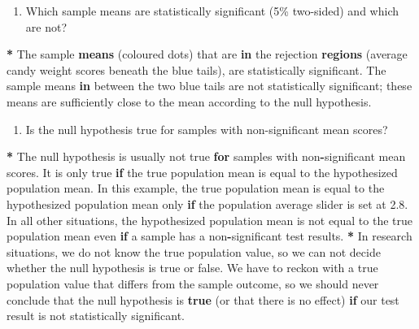 \documentclass[a4paper]{book}
\newenvironment{Shaded}{\begin{snugshade}}{\end{snugshade}}
\newcommand{\KeywordTok}[1]{\textcolor[rgb]{0,0,0}{\textbf{#1}}}
\newcommand{\FloatTok}[1]{\textcolor[rgb]{0.00,0.00,0.00}{#1}}
\newcommand{\StringTok}[1]{\textcolor[rgb]{0.00,0.00,0.00}{#1}}
\newcommand{\ControlFlowTok}[1]{\textcolor[rgb]{0.00,0.00,0.00}{\textbf{#1}}}
\newcommand{\OperatorTok}[1]{\textcolor[rgb]{0.00,0.00,0.00}{\textbf{#1}}}
\newcommand{\NormalTok}[1]{#1}
\providecommand{\tightlist}{%
  \setlength{\itemsep}{0pt}\setlength{\parskip}{0pt}}
\theoremstyle{definition}
\theoremstyle{definition}
\theoremstyle{definition}
\theoremstyle{remark}
\begin{document}
\begin{enumerate}
\def\labelenumi{\arabic{enumi}.}
\tightlist
\item
  Which sample means are statistically significant (5\% two-sided) and
  which are not?
\end{enumerate}

\begin{Shaded}
\begin{Highlighting}[]
\OperatorTok{*}\StringTok{ }\NormalTok{The sample }\KeywordTok{means}\NormalTok{ (coloured dots) that are }\ControlFlowTok{in}\NormalTok{ the rejection }\KeywordTok{regions}\NormalTok{ (average}
\NormalTok{candy weight scores beneath the blue tails), are statistically significant.}
\NormalTok{The sample means }\ControlFlowTok{in}\NormalTok{ between the two blue tails are not statistically}
\NormalTok{significant; these means are sufficiently close to the mean according to the }
\NormalTok{null hypothesis.}
\end{Highlighting}
\end{Shaded}

\begin{enumerate}
\def\labelenumi{\arabic{enumi}.}
\setcounter{enumi}{1}
\tightlist
\item
  Is the null hypothesis true for samples with non-significant mean
  scores?
\end{enumerate}

\begin{Shaded}
\begin{Highlighting}[]
\OperatorTok{*}\StringTok{ }\NormalTok{The null hypothesis is usually not true }\ControlFlowTok{for}\NormalTok{ samples with non}\OperatorTok{-}\NormalTok{significant}
\NormalTok{mean scores. It is only true }\ControlFlowTok{if}\NormalTok{ the true population mean is equal to the}
\NormalTok{hypothesized population mean. In this example, the true population mean is}
\NormalTok{equal to the hypothesized population mean only }\ControlFlowTok{if}\NormalTok{ the population average}
\NormalTok{slider is set at }\FloatTok{2.8}\NormalTok{. In all other situations, the hypothesized population}
\NormalTok{mean is not equal to the true population mean even }\ControlFlowTok{if}\NormalTok{ a sample has a}
\NormalTok{non}\OperatorTok{-}\NormalTok{significant test results.}
\OperatorTok{*}\StringTok{ }\NormalTok{In research situations, we do not know the true population value, so we can}
\NormalTok{not decide whether the null hypothesis is true or false. We have to reckon}
\NormalTok{with a true population value that differs from the sample outcome, so we}
\NormalTok{should never conclude that the null hypothesis is }\KeywordTok{true}\NormalTok{ (or that there is no}
\NormalTok{effect) }\ControlFlowTok{if}\NormalTok{ our test result is not statistically significant.}
\end{Highlighting}
\end{Shaded}
\end{document}
